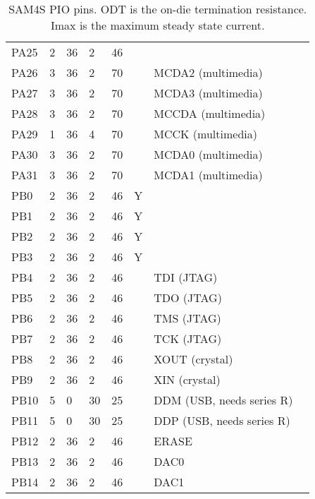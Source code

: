 \begin{table}
\begin{tabular}{llllllll}
    PA25    &  2 & 36 &  2 & 46 &   &    &    \\
    PA26    &  3 & 36 &  2 & 70 &   & MCDA2 (multimedia)      &    \\
    PA27    &  3 & 36 &  2 & 70 &   & MCDA3 (multimedia)      &    \\
    PA28    &  3 & 36 &  2 & 70 &   & MCCDA (multimedia)      &    \\
    PA29    &  1 & 36 &  4 & 70 &   & MCCK (multimedia)       &    \\
    PA30    &  3 & 36 &  2 & 70 &   & MCDA0 (multimedia)      &    \\
    PA31    &  3 & 36 &  2 & 70 &   & MCDA1 (multimedia)      &    \\
    PB0     &  2 & 36 &  2 & 46 & Y &     &     \\
    PB1     &  2 & 36 &  2 & 46 & Y &      &     \\
    PB2     &  2 & 36 &  2 & 46 & Y &      &     \\
    PB3     &  2 & 36 &  2 & 46 & Y &      &     \\
    PB4     &  2 & 36 &  2 & 46 &   & TDI (JTAG)      &    \\
    PB5     &  2 & 36 &  2 & 46 &   & TDO (JTAG)     &    \\
    PB6     &  2 & 36 &  2 & 46 &   &  TMS (JTAG)     &    \\
    PB7     &  2 & 36 &  2 & 46 &   & TCK (JTAG)     &    \\
    PB8     &  2 & 36 &  2 & 46 &   & XOUT (crystal)    &    \\
    PB9     &  2 & 36 &  2 & 46 &   & XIN  (crystal)    &    \\
    PB10    &  5 & 0  & 30 & 25 &   & DDM (USB, needs series R)       &    \\
    PB11    &  5 & 0  & 30 & 25 &   & DDP (USB, needs series R)      &    \\
    PB12    &  2 & 36 &  2 & 46 &   & ERASE      &    \\
    PB13    &  2 & 36 &  2 & 46 &   & DAC0      &    \\
    PB14    &  2 & 36 &  2 & 46 &   & DAC1      &    \\
  \end{tabular}
  \caption{SAM4S PIO pins.  ODT is the on-die termination resistance.
    Imax is the maximum steady state current.}
  \label{tab:pio-pins}
\end{table}

